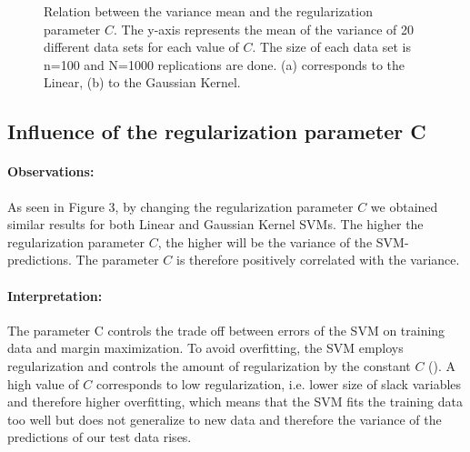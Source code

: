 \documentclass[a4paper]{article}
\begin{document}
\begin{figure}[!htb]
\begin{center}

\caption{Relation between the variance mean and the regularization parameter $C$. The y-axis represents the mean of the variance of 20 different data sets for each value of $C$. The size of each data set is n=100 and N=1000 replications are done. (a) corresponds to the Linear, (b) to the Gaussian Kernel.}
\label{fig3}
\end{center}
\end{figure}



\subsection{Influence of the regularization parameter C}
\paragraph{Observations:}
As seen in Figure 3\label{fig3}, by changing the regularization parameter $C$ we obtained similar results for both Linear and Gaussian Kernel SVMs. The higher the regularization parameter $C$, the higher will be the variance of the SVM-predictions. The parameter $C$ is therefore positively correlated with the variance.
\paragraph{Interpretation:}
The parameter C controls the trade off between errors of the SVM on training data and margin maximization. To avoid overfitting, the SVM employs regularization and controls the amount of regularization by the constant $C$ (\cite{hastie_elements_2005}). A high value of $C$ corresponds to low regularization, i.e. lower size of slack variables and therefore higher overfitting, which means that the SVM fits the training data too well but does not generalize to new data and therefore the variance of the predictions of our test data rises.
\end{document}
